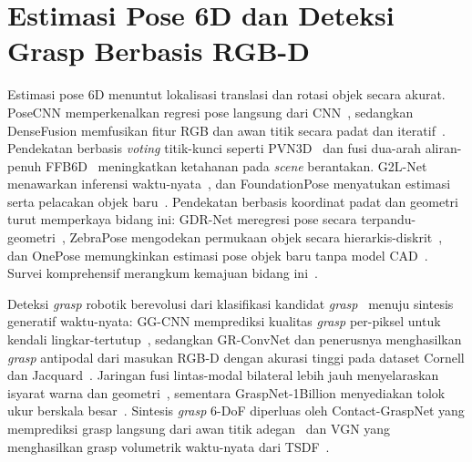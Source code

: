 \documentclass[11pt,a4paper]{article}
\begin{document}
\section{Estimasi Pose 6D dan Deteksi Grasp Berbasis RGB-D}
Estimasi pose 6D menuntut lokalisasi translasi dan rotasi objek secara akurat.
PoseCNN memperkenalkan regresi pose langsung dari CNN~\cite{xiang2018posecnn},
sedangkan DenseFusion memfusikan fitur RGB dan awan titik secara padat dan
iteratif~\cite{wang2019densefusion}. Pendekatan berbasis \emph{voting}
titik-kunci seperti PVN3D~\cite{he2020pvn3d} dan fusi dua-arah aliran-penuh
FFB6D~\cite{he2021ffb6d} meningkatkan ketahanan pada \emph{scene} berantakan.
G2L-Net menawarkan inferensi waktu-nyata~\cite{chen2020g2lnet}, dan FoundationPose
menyatukan estimasi serta pelacakan objek baru~\cite{wen2024foundationpose}.
Pendekatan berbasis koordinat padat dan geometri turut memperkaya bidang ini:
GDR-Net meregresi pose secara terpandu-geometri~\cite{wang2021gdrnet}, ZebraPose
mengodekan permukaan objek secara hierarkis-diskrit~\cite{su2022zebrapose}, dan
OnePose memungkinkan estimasi pose objek baru tanpa model CAD~\cite{sun2022onepose}.
Survei komprehensif merangkum kemajuan bidang ini~\cite{hoque2021posesurvey}.

Deteksi \emph{grasp} robotik berevolusi dari klasifikasi kandidat
\emph{grasp}~\cite{lenz2015grasp} menuju sintesis generatif waktu-nyata: GG-CNN
memprediksi kualitas \emph{grasp} per-piksel untuk kendali
lingkar-tertutup~\cite{morrison2018ggcnn}, sedangkan GR-ConvNet dan
penerusnya menghasilkan \emph{grasp} antipodal dari masukan RGB-D dengan akurasi
tinggi pada dataset Cornell dan Jacquard~\cite{kumra2020grconvnet,
kumra2022grconvnetv2,depierre2018jacquard}. Jaringan fusi lintas-modal bilateral
lebih jauh menyelaraskan isyarat warna dan geometri~\cite{zhang2023bcmfnet},
sementara GraspNet-1Billion menyediakan tolok ukur berskala
besar~\cite{fang2020graspnet}. Sintesis \emph{grasp} 6-DoF diperluas oleh
Contact-GraspNet yang memprediksi grasp langsung dari awan titik
adegan~\cite{sundermeyer2021contactgraspnet} dan VGN yang menghasilkan grasp
volumetrik waktu-nyata dari TSDF~\cite{breyer2021vgn}.

\end{document}
